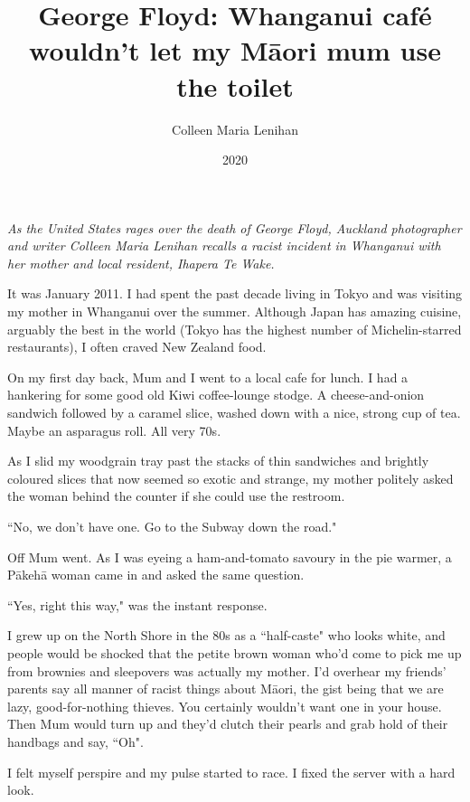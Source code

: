 \documentclass[10pt,a4paper]{article}
\newcommand{\qm}[1]{``#1"}
\begin{document}
\title{George Floyd: Whanganui café wouldn't let my Māori mum use the toilet}
\date{2020}
\author{Colleen Maria Lenihan}

\maketitle

\noindent\textit{As the United States rages over the death of George Floyd, Auckland photographer and writer Colleen Maria Lenihan recalls a racist incident in Whanganui with her mother and local resident, Ihapera Te Wake.}

\bigskip

\noindent\linenumbers It was January 2011. I had spent the past decade living in Tokyo and was visiting my mother in Whanganui over the summer. Although Japan has amazing cuisine, arguably the best in the world (Tokyo has the highest number of Michelin-starred restaurants), I often craved New Zealand food.

On my first day back, Mum and I went to a local cafe for lunch. I had a hankering for some good old Kiwi coffee-lounge stodge. A cheese-and-onion sandwich followed by a caramel slice, washed down with a nice, strong cup of tea. Maybe an asparagus roll. All very 70s.

As I slid my woodgrain tray past the stacks of thin sandwiches and brightly coloured slices that now seemed so exotic and strange, my mother politely asked the woman behind the counter if she could use the restroom.

\qm{No, we don't have one. Go to the Subway down the road.}

Off Mum went. As I was eyeing a ham-and-tomato savoury in the pie warmer, a Pākehā woman came in and asked the same question.

\qm{Yes, right this way,} was the instant response.

I grew up on the North Shore in the 80s as a \qm{half-caste} who looks white, and people would be shocked that the petite brown woman who'd come to pick me up from brownies and sleepovers was actually my mother. I'd overhear my friends' parents say all manner of racist things about Māori, the gist being that we are lazy, good-for-nothing thieves. You certainly wouldn't want one in your house. Then Mum would turn up and they'd clutch their pearls and grab hold of their handbags and say, \qm{Oh}.

I felt myself perspire and my pulse started to race. I fixed the server with a hard look.
\end{document}
